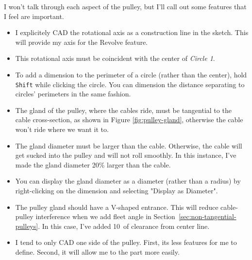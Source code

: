 I won't talk through each aspect of the pulley, but I'll call out some features
that I feel are important.

\begin{itemize}
\item{} I explicitely CAD the rotational axis as a construction line in the sketch.
  This will provide my axis for the Revolve feature.
\item{} This rotational axis must be coincident with the center of \emph{Circle
  1}.
\item{} To add a dimension to the perimeter of a circle (rather than the
  center),
  hold \texttt{Shift} while clicking the circle. You can dimension the distance
  separating to circles' perimeters in the same fashion.
\item{} The gland of the pulley, where the cables ride, must be tangential to the
  cable cross-section, as shown in Figure \ref{fig:pulley-gland}, otherwise
  the cable won't ride where we want it to.
\item{} The gland diameter must be larger than the cable. Otherwise, the cable will get sucked into the pulley and will not roll smoothly. In this instance, I've made the gland diameter 20\% larger than the cable.
\item{} You can display the gland diameter as a diameter (rather than a radius)
  by right-clicking on the dimension and selecting "Display as Diameter".
\item{} The pulley gland should have a V-shaped entrance. This will reduce
cable-pulley interference when we add fleet angle in Section~\ref{sec:non-tangential-pulleys}. In this case, I've added 10\textdegree \ of clearance from center line.
\item{} I tend to only CAD one side of the pulley. First, its less features for me to
  define. Second, it will allow me to  the part more easily.
\end{itemize}

